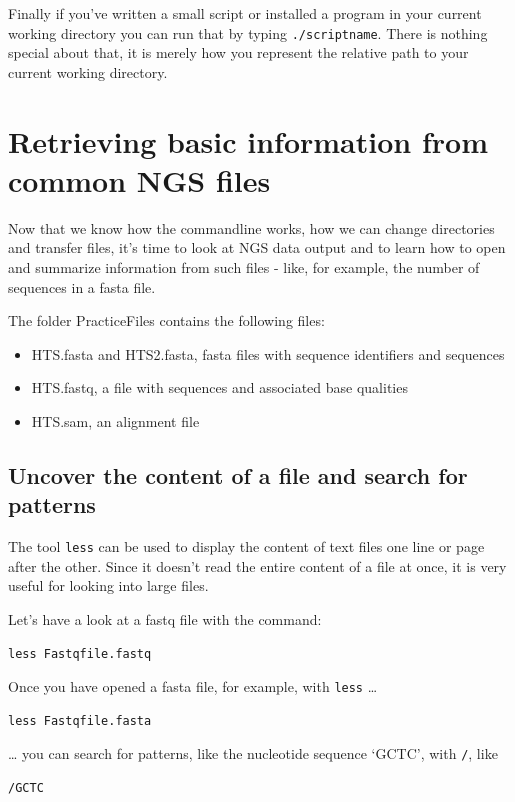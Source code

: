 \documentclass[11pt]{article}
\begin{document}
Finally if you've written a small script or installed a program in your
current working directory you can run that by typing \texttt{./scriptname}. There
is nothing special about that, it is merely how you represent the
relative path to your current working directory.
\section{Retrieving basic information from common NGS files}
\label{sec-4}

 
Now that we know how the commandline works, how we can change
directories and transfer files, it's time to look at NGS data output
and to learn how to open and summarize information from such files -
like, for example, the number of sequences in a fasta file.

The folder PracticeFiles contains the following files:
\begin{itemize}
\item HTS.fasta and HTS2.fasta, fasta files with sequence identifiers and sequences
\item HTS.fastq, a file with sequences and associated base qualities
\item HTS.sam, an alignment file
\end{itemize}
\subsection{Uncover the content of a file and search for patterns}
\label{sec-4-1}

The tool \texttt{less} can be used to display the content of text files one
line or page after the other. Since it doesn't read the entire content
of a file at once, it is very useful for looking into large files.

Let's have a look at a fastq file with the command:


\begin{verbatim}
less Fastqfile.fastq
\end{verbatim}

Once you have opened a fasta file, for example, with \texttt{less} \ldots{}


\begin{verbatim}
less Fastqfile.fasta
\end{verbatim}

\ldots{} you can search for patterns, like the nucleotide sequence `GCTC', with \texttt{/}, like


\begin{verbatim}
/GCTC
\end{verbatim}
\end{document}
